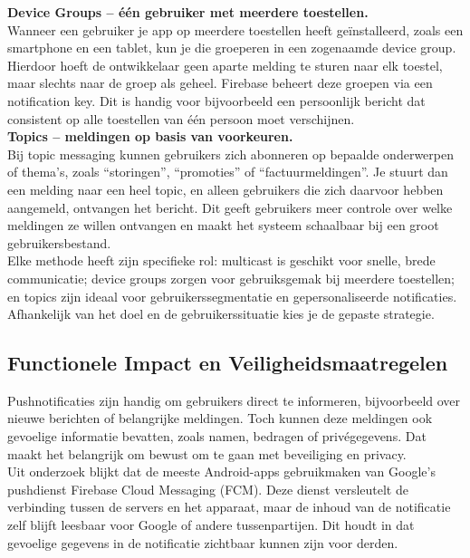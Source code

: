 \textbf{Device Groups – één gebruiker met meerdere toestellen.}\\
Wanneer een gebruiker je app op meerdere toestellen heeft geïnstalleerd, zoals een smartphone en een tablet, kun je die groeperen in een zogenaamde device group. Hierdoor hoeft de ontwikkelaar geen aparte melding te sturen naar elk toestel, maar slechts naar de groep als geheel. Firebase beheert deze groepen via een notification key. Dit is handig voor bijvoorbeeld een persoonlijk bericht dat consistent op alle toestellen van één persoon moet verschijnen.\\

\textbf{Topics – meldingen op basis van voorkeuren.}\\  
Bij topic messaging kunnen gebruikers zich abonneren op bepaalde onderwerpen of thema’s, zoals “storingen”, “promoties” of “factuurmeldingen”. Je stuurt dan een melding naar een heel topic, en alleen gebruikers die zich daarvoor hebben aangemeld, ontvangen het bericht. Dit geeft gebruikers meer controle over welke meldingen ze willen ontvangen en maakt het systeem schaalbaar bij een groot gebruikersbestand.\\

Elke methode heeft zijn specifieke rol: multicast is geschikt voor snelle, brede communicatie; device groups zorgen voor gebruiksgemak bij meerdere toestellen; en topics zijn ideaal voor gebruikerssegmentatie en gepersonaliseerde notificaties. Afhankelijk van het doel en de gebruikerssituatie kies je de gepaste strategie.


\subsection{Functionele Impact en Veiligheidsmaatregelen}

Pushnotificaties zijn handig om gebruikers direct te informeren, bijvoorbeeld over nieuwe berichten of belangrijke meldingen. Toch kunnen deze meldingen ook gevoelige informatie bevatten, zoals namen, bedragen of privégegevens. Dat maakt het belangrijk om bewust om te gaan met beveiliging en privacy.\\

Uit onderzoek blijkt dat de meeste Android-apps gebruikmaken van Google’s pushdienst Firebase Cloud Messaging (FCM)\autocite{Neteler2024}. Deze dienst versleutelt de verbinding tussen de servers en het apparaat, maar de inhoud van de notificatie zelf blijft leesbaar voor Google of andere tussenpartijen. Dit houdt in dat gevoelige gegevens in de notificatie zichtbaar kunnen zijn voor derden.\\

